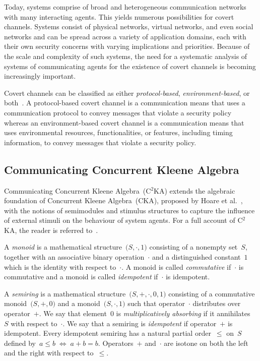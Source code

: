 \documentclass[copyright,creativecommons]{eptcs}
\makeatletter
\newcommand{\etal}{\textrm{et al.}\@\xspace}
\newcommand{\socas}{systems of communicating agents\@\xspace}
\newcommand{\monoid}[3]{\big(#1, #2, #3 \big)}
\newcommand{\semiring}[5]{\big(#1, #2, #3, #4, #5\big)}
\newcommand{\mIff}{\;\Longleftrightarrow\;}
\newcommand{\CKAabbrv}{CKA\@\xspace}
\newcommand{\CCKA}{Communicating Concurrent Kleene Algebra\@\xspace}
\newcommand{\CCKAabbrv}{C$^2$KA\@\xspace}
\makeatother
\begin{document}
Today, systems comprise of broad and heterogeneous communication networks with many interacting agents. This yields numerous possibilities for covert channels. Systems consist of physical networks, virtual networks, and even social networks and can be spread across a variety of application domains, each with their own security concerns with varying implications and priorities. Because of the scale and complexity of such systems, the need for a systematic analysis of \socas for the existence of covert channels is becoming increasingly important. 

Covert channels can be classified as either \emph{protocol-based}, \emph{environment-based}, or both~\cite{Jaskolka2010aa}. A protocol-based covert channel is a communication means that uses a communication protocol to convey messages that violate a security policy whereas an environment-based covert channel is a communication means that uses environmental resources, functionalities, or features, including timing information, to convey messages that violate a security policy.




\subsection{\CCKA}
\label{sub:c2ka}


\CCKA~(\CCKAabbrv) extends the algebraic foundation of Concurrent Kleene Algebra~(\CKAabbrv), proposed by Hoare \etal~\cite{Hoare2009aa,Hoare2009ab,Hoare2010aa,Hoare2011aa}, with the notions of semimodules and stimulus structures to capture the influence of external stimuli on the behaviour of system agents. For a full account of \CCKAabbrv, the reader is referred to~\cite{Jaskolka2013aa,Jaskolka2014aa}. 

A \emph{monoid} is a mathematical structure~$\monoid{S}{\cdot}{1}$ consisting of a nonempty set~$S$, together with an associative binary operation~$\cdot$ and a distinguished constant~$1$ which is the identity with respect to~$\cdot$. A monoid is called \emph{commutative} if~$\cdot$ is commutative and a monoid is called \emph{idempotent} if~$\cdot$ is idempotent.

A \emph{semiring} is a mathematical structure~$\semiring{S}{+}{\cdot}{0}{1}$ consisting of a commutative monoid~$\monoid{S}{+}{0}$  and a monoid~$\monoid{S}{\cdot}{1}$ such that operator~$\cdot$ distributes over operator~$+$. We say that element~$0$ is \emph{multiplicatively absorbing} if it annihilates~$S$ with respect to~$\cdot$. We say that a semiring is \emph{idempotent} if operator~$+$ is idempotent. Every idempotent semiring has a natural partial order~$\le$ on~$S$ defined by~$a \le b \!\mIff\! a + b = b$. Operators~$+$ and~$\cdot$ are isotone on both the left and the right with respect to~$\le$.
\end{document}
